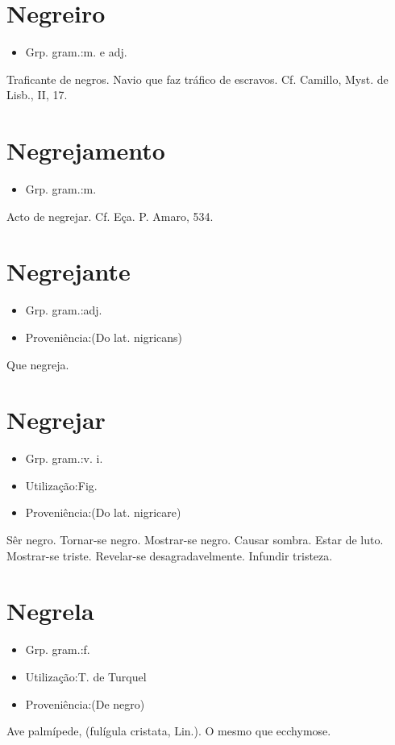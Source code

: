 \section{Negreiro}
\begin{itemize}
\item {Grp. gram.:m.  e  adj.}
\end{itemize}
Traficante de negros.
Navio que faz tráfico de escravos. Cf. Camillo, \textunderscore Myst. de Lisb.\textunderscore , II, 17.
\section{Negrejamento}
\begin{itemize}
\item {Grp. gram.:m.}
\end{itemize}
Acto de negrejar. Cf. Eça. \textunderscore P. Amaro\textunderscore , 534.
\section{Negrejante}
\begin{itemize}
\item {Grp. gram.:adj.}
\end{itemize}
\begin{itemize}
\item {Proveniência:(Do lat. \textunderscore nigricans\textunderscore )}
\end{itemize}
Que negreja.
\section{Negrejar}
\begin{itemize}
\item {Grp. gram.:v. i.}
\end{itemize}
\begin{itemize}
\item {Utilização:Fig.}
\end{itemize}
\begin{itemize}
\item {Proveniência:(Do lat. \textunderscore nigricare\textunderscore )}
\end{itemize}
Sêr negro.
Tornar-se negro.
Mostrar-se negro.
Causar sombra.
Estar de luto.
Mostrar-se triste.
Revelar-se desagradavelmente.
Infundir tristeza.
\section{Negrela}
\begin{itemize}
\item {Grp. gram.:f.}
\end{itemize}
\begin{itemize}
\item {Utilização:T. de Turquel}
\end{itemize}
\begin{itemize}
\item {Proveniência:(De \textunderscore negro\textunderscore )}
\end{itemize}
Ave palmípede, (\textunderscore fulígula cristata\textunderscore , Lin.).
O mesmo que \textunderscore ecchymose\textunderscore .
